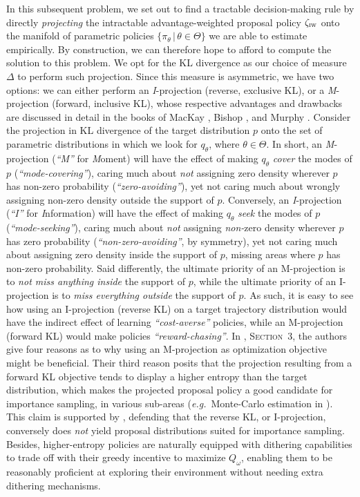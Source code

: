 In this subsequent problem, we set out to find a tractable decision-making rule by directly \emph{projecting} the
intractable advantage-weighted proposal policy $\zeta_\textsc{iw}$
onto the manifold of parametric policies $\{ \pi_\theta \, | \, \theta \in \Theta \}$
we are able to estimate empirically.
By construction, we can therefore hope to afford to compute the solution to this problem.
We opt for the KL divergence as our choice of measure $\Delta$ to perform such projection.
Since this measure is asymmetric, we have two options:
we can either perform an \textit{I}-projection (reverse, exclusive KL),
or a \textit{M}-projection (forward, inclusive KL), whose respective advantages and drawbacks are discussed
in detail in the books of MacKay \cite{MacKay2003-qn},
Bishop \cite{Bishop2006-xz},
and Murphy \cite{Murphy2012-ih}.
Consider the projection in KL divergence
of the target distribution $p$ onto the set of parametric distributions
in which we look for $q_\theta$, where $\theta \in \Theta$.
In short, an \textit{M}-projection (\textit{``M''} for \textit{M}oment)
will have the effect of making $q_\theta$ \textit{cover} the modes of $p$
(\textit{``mode-covering''}),
caring much about \emph{not} assigning zero density wherever $p$ has non-zero probability (\textit{``zero-avoiding''}),
yet not caring much about wrongly assigning non-zero density outside the support of $p$.
Conversely, an \textit{I}-projection (\textit{``I''} for \textit{I}nformation)
will have the effect of making $q_\theta$ \textit{seek} the modes of $p$
(\textit{``mode-seeking''}),
caring much about \emph{not} assigning \emph{non-}zero density wherever $p$ has zero probability
(\textit{``non-zero-avoiding''}, by symmetry),
yet not caring much about assigning zero density inside the support of $p$, missing areas where $p$
has non-zero probability.
Said differently, the ultimate priority of an M-projection is to \emph{not miss anything inside} the support of $p$,
while the ultimate priority of an I-projection is to \emph{miss everything outside} the support of $p$.
As such, it is easy to see how using an I-projection (reverse KL)
on a target trajectory distribution would have the
indirect effect of learning \emph{``cost-averse''} policies,
while an M-projection (forward KL)
would make policies \emph{``reward-chasing''}.
In \cite{Gu2015-ax}, \textsc{Section~3},
the authors give four reasons as to why using an M-projection as optimization objective might be beneficial.
Their third reason posits that the projection resulting from a forward KL objective tends to
display a higher entropy than the target distribution, which makes the projected proposal policy a good
candidate for importance sampling, in various sub-areas (\textit{e.g.}~Monte-Carlo estimation in
\cite{Gu2015-ax}).
This claim is supported by \cite{MacKay2003-qn},
defending that the reverse KL, or I-projection, conversely does \emph{not} yield proposal distributions
suited for importance sampling.
Besides, higher-entropy policies are naturally equipped with dithering capabilities to trade off with their
greedy incentive to maximize $Q_\omega$, enabling them to be reasonably proficient at exploring their environment
without needing extra dithering mechanisms.

